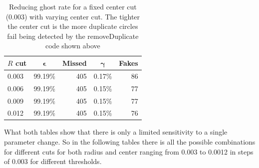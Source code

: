\documentclass[11pt,twoside]{scrreprt}
\begin{document}
\begin{table}[htbp]
  \caption{Reducing ghost rate for a fixed center cut (0.003) with varying center cut. The tighter the center cut is
  the more duplicate circles fail being detected by the removeDuplicate code shown above}
  \label{tab:cut_variation_2}
  \centering

  \begin{tabular}{lcrcr}
  \toprule
  \textbf{$R$ cut} & $\boldsymbol{\epsilon}$ & \textbf{Missed} & $\boldsymbol{\gamma}$ & \textbf{Fakes} \\
  \midrule
  0.003 & 99.19\% & 405 & 0.17\% & 86 \\
  0.006 & 99.19\% & 405 & 0.15\% & 77 \\
  0.009 & 99.19\% & 405 & 0.15\% & 77 \\
  0.012 & 99.19\% & 405 & 0.15\% & 76 \\
  \bottomrule
  \end{tabular}
\end{table}

What both tables show that there is only a limited sensitivity to a single parameter change. So in the following
tables there is all the possible combinations for different cuts for both radius and center ranging from 0.003 to
0.0012 in steps of $0.003$ for different thresholds. 
\end{document}
